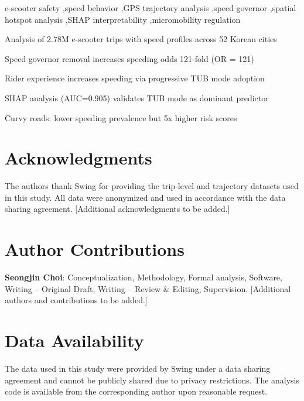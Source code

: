 \documentclass[a4paper,fleqn]{cas-sc}
\begin{document}
\begin{keywords}
e-scooter safety \sep speed behavior \sep GPS trajectory analysis \sep speed governor \sep spatial hotspot analysis \sep SHAP interpretability \sep micromobility regulation
\end{keywords}

\begin{highlights}
\item Analysis of 2.78M e-scooter trips with speed profiles across 52 Korean cities
\item Speed governor removal increases speeding odds 121-fold (OR = 121)
\item Rider experience increases speeding via progressive TUB mode adoption
\item SHAP analysis (AUC=0.905) validates TUB mode as dominant predictor
\item Curvy roads: lower speeding prevalence but 5x higher risk scores
\end{highlights}

\maketitle











\section*{Acknowledgments}
The authors thank Swing for providing the trip-level and trajectory datasets used in this study. All data were anonymized and used in accordance with the data sharing agreement. [Additional acknowledgments to be added.]

\section*{Author Contributions}
\textbf{Seongjin Choi}: Conceptualization, Methodology, Formal analysis, Software, Writing -- Original Draft, Writing -- Review \& Editing, Supervision. [Additional authors and contributions to be added.]

\section*{Data Availability}
The data used in this study were provided by Swing under a data sharing agreement and cannot be publicly shared due to privacy restrictions. The analysis code is available from the corresponding author upon reasonable request.



\end{document}
